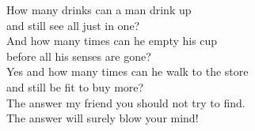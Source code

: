 
            How many drinks can a man drink up \\
            and still see all just in one? \\
            And how many times can he empty his cup \\
            before all his senses are gone? \\
            Yes and how many times can he walk to the store \\
            and still be fit to buy more? \\
            The answer my friend you should not try to find. \\
            The answer will surely blow your mind! \\
